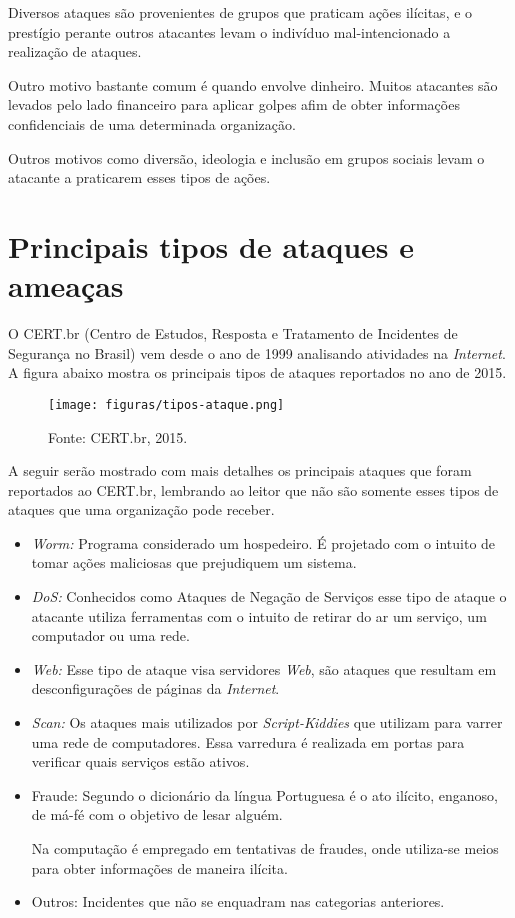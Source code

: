 Diversos ataques são provenientes de grupos que praticam ações ilícitas, e o prestígio perante outros atacantes levam o indivíduo mal-intencionado a realização de ataques.

Outro motivo bastante comum é quando envolve dinheiro. Muitos atacantes são levados pelo lado financeiro para aplicar golpes afim de obter informações confidenciais de uma determinada organização.

Outros motivos como diversão, ideologia e inclusão em grupos sociais levam o atacante a praticarem esses tipos de ações. 

\section{Principais tipos de ataques e ameaças}
O CERT.br (Centro de Estudos, Resposta e Tratamento de Incidentes de Segurança no Brasil) vem desde o ano de 1999 analisando atividades na \textit{Internet}. A figura abaixo mostra os principais tipos de ataques reportados no ano de 2015.

\begin{figure}[!h]
\centering
\texttt{[image: figuras/tipos-ataque.png]}
\caption{Fonte: CERT.br, 2015.} 	
\end{figure}

A seguir serão mostrado com mais detalhes os principais ataques que foram reportados ao CERT.br, lembrando ao leitor que não são somente esses tipos de ataques que uma organização pode receber.

\begin{itemize}
\item \textit{Worm:} Programa considerado um hospedeiro. É projetado com o intuito de tomar ações maliciosas que prejudiquem um sistema.

\item \textit{DoS:} Conhecidos como Ataques de Negação de Serviços esse tipo de ataque o atacante utiliza ferramentas com o intuito de retirar do ar um serviço, um computador ou uma rede.

\item \textit{Web:} Esse tipo de ataque visa servidores \textit{Web}, são ataques que resultam em desconfigurações de páginas da \textit{Internet}.

\item \textit{Scan:} Os ataques mais utilizados por \textit{Script-Kiddies} que utilizam para varrer uma rede de computadores. Essa varredura é realizada em portas para verificar quais serviços estão ativos. 

\item Fraude: Segundo o dicionário da língua Portuguesa é o ato ilícito, enganoso, de má-fé com o objetivo de lesar alguém. 

Na computação é empregado em tentativas de fraudes, onde utiliza-se meios para obter informações de maneira ilícita.

\item Outros: Incidentes que não se enquadram nas categorias anteriores.
\end{itemize}

